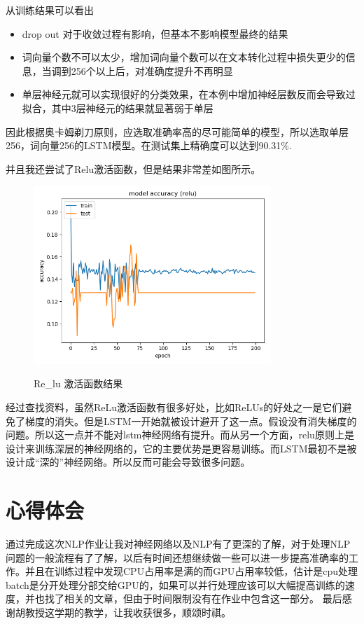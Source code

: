 \documentclass[UTF8]{ctexart}
\begin{document}
\newpage
从训练结果可以看出
\begin{itemize}
	\item drop out 对于收敛过程有影响，但基本不影响模型最终的结果
	\item 词向量个数不可以太少，增加词向量个数可以在文本转化过程中损失更少的信息，当调到256个以上后，对准确度提升不再明显
	\item 单层神经元就可以实现很好的分类效果，在本例中增加神经层数反而会导致过拟合，其中3层神经元的结果就显著弱于单层
\end{itemize}
\vspace{3mm}
因此根据奥卡姆剃刀原则，应选取准确率高的尽可能简单的模型，所以选取单层256，词向量256的LSTM模型。在测试集上精确度可以达到90.31\%.

并且我还尝试了Relu激活函数，但是结果非常差如图所示。
\begin{figure}[H]
  \centering
  \label{fig:Per6A}\includegraphics[width=0.8\textwidth]{relu_accuracy.png}\
  \caption{Re\_lu 激活函数结果}
  \label{fig:oscil}
\end{figure}
经过查找资料，虽然ReLu激活函数有很多好处，比如ReLUs的好处之一是它们避免了梯度的消失。但是LSTM一开始就被设计避开了这一点。假设没有消失梯度的问题。所以这一点并不能对lstm神经网络有提升。而从另一个方面，relu原则上是设计来训练深层的神经网络的，它的主要优势是更容易训练。而LSTM最初不是被设计成“深的”神经网络。所以反而可能会导致很多问题。


\newpage
\section{心得体会}

通过完成这次NLP作业让我对神经网络以及NLP有了更深的了解，对于处理NLP问题的一般流程有了了解，以后有时间还想继续做一些可以进一步提高准确率的工作。并且在训练过程中发现CPU占用率是满的而GPU占用率较低，估计是cpu处理batch是分开处理分部交给GPU的，如果可以并行处理应该可以大幅提高训练的速度，并也找了相关的文章，但由于时间限制没有在作业中包含这一部分。
最后感谢胡教授这学期的教学，让我收获很多，顺颂时祺。
\end{document}
